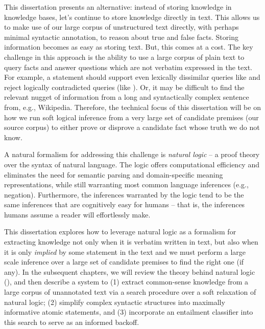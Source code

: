 This dissertation presents an alternative:
  instead of storing knowledge in knowledge bases, let's continue to store knowledge
  directly in text.
This allows us to make use of our large corpus of unstructured text directly, with
  perhaps minimal syntactic annotation, to reason about true and false facts.
Storing information becomes as easy as storing text.
But, this comes at a cost.
The key challenge in this approach is the ability to use a large 
  corpus of plain text to query facts and answer questions which are not verbatim 
  expressed in the text.
For example, a statement  should support even lexically 
  dissimilar queries like  and reject logically 
  contradicted queries (like ).
Or, it may be difficult to find the relevant nugget of information from a long and syntactically
  complex sentence from, e.g., Wikipedia.
Therefore, the technical focus of this dissertation will be on how we run soft logical
  inference from a very large set of candidate premises (our source corpus) to either
  prove or disprove a candidate fact whose truth we do not know.

A natural formalism for addressing this challenge is \textit{natural logic} -- a proof 
  theory over the syntax of natural language.
The logic offers computational efficiency and eliminates the need for semantic 
  parsing and domain-specific meaning representations, while still warranting most 
  common language inferences (e.g., negation). 
Furthermore, the inferences warranted by the logic tend to be 
  the same inferences that are cognitively easy for humans -- that is, 
  the inferences humans assume a reader will effortlessly make.

This dissertation explores how to leverage natural logic as a formalism for
  extracting knowledge not only when it is verbatim written in text, but also when
  it is only \textit{implied} by some statement in the text and we must perform
  a large scale inference over a large set of candidate premises to find the right one
  (if any).
In the subsequent chapters, we will review the theory behind natural logic
  (), and then describe a system to
  (1) extract common-sense knowledge from a large corpus of unannotated text via 
    a search procedure over a soft relaxation of natural logic;
  (2) simplify complex syntactic structures into maximally informative atomic
    statements, and
  (3) incorporate an entailment classifier into this search to serve as an
    informed backoff.



